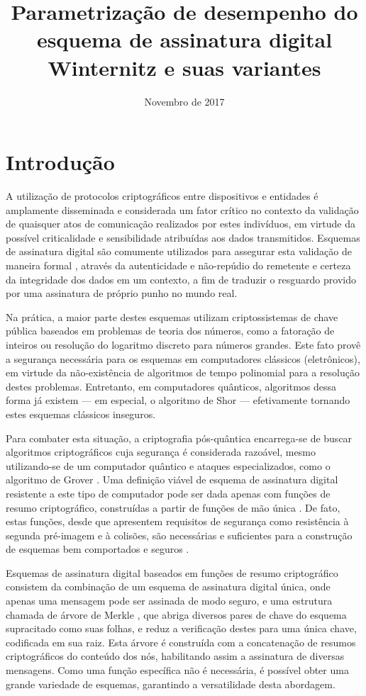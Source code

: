 \documentclass[12pt]{article}
\title{Parametrização de desempenho do esquema de assinatura digital Winternitz e suas variantes}
\author{Novembro de 2017}
\date{}
\begin{document}
\maketitle

\section{Introdução}

A utilização de protocolos criptográficos entre dispositivos e entidades é
amplamente disseminada e considerada um fator crítico no contexto da validação
de quaisquer atos de comunicação realizados por estes indivíduos, em virtude da
possível criticalidade e sensibilidade atribuídas aos dados transmitidos.
Esquemas de assinatura digital são comumente utilizados para assegurar esta
validação de maneira formal \cite{Goldreich:2004:FCV:975541}, através da
autenticidade e não-repúdio do remetente e certeza da integridade dos dados em
um contexto, a fim de traduzir o resguardo provido por uma assinatura de
próprio punho no mundo real.

Na prática, a maior parte destes esquemas utilizam criptossistemas de chave
pública baseados em problemas de teoria dos números, como a fatoração de
inteiros ou resolução do logaritmo discreto para números grandes. Este fato
provê a segurança necessária para os esquemas em computadores clássicos
(eletrônicos), em virtude da não-existência de algoritmos de tempo polinomial
para a resolução destes problemas. Entretanto, em computadores quânticos,
algoritmos dessa forma já existem --- em especial, o algoritmo de Shor
\cite{Shor:1997:PAP:264393.264406} --- efetivamente tornando estes esquemas clássicos inseguros. 

Para combater esta situação, a criptografia pós-quântica encarrega-se de buscar
algoritmos criptográficos cuja segurança é considerada razoável, mesmo
utilizando-se de um computador quântico e ataques especializados, como o
algoritmo de Grover \cite{Grover:1996:FQM:237814.237866}. Uma definição viável
de esquema de assinatura digital resistente a este tipo de computador pode ser
dada apenas com funções de resumo criptográfico, construídas a partir de
funções de mão única \cite{cryptoeprint:2005:328}. De fato, estas funções,
desde que apresentem requisitos de segurança como resistência à segunda
pré-imagem e à colisões, são necessárias e suficientes para a construção de
esquemas bem comportados e seguros \cite{Rompel:1990:OFN:100216.100269}.

Esquemas de assinatura digital baseados em funções de resumo criptográfico
consistem da combinação de um esquema de assinatura digital única, onde apenas
uma mensagem pode ser assinada de modo seguro, e uma estrutura chamada de
árvore de Merkle \cite{Merkle:1989:CDS:118209.118230}, que abriga diversos
pares de chave do esquema supracitado como suas folhas, e reduz a verificação
destes para uma única chave, codificada em sua raiz. Esta árvore é construída
com a concatenação de resumos criptográficos do conteúdo dos nós, habilitando
assim a assinatura de diversas mensagens. Como uma função específica não é
necessária, é possível obter uma grande variedade de esquemas, garantindo a
versatilidade desta abordagem.
\end{document}
